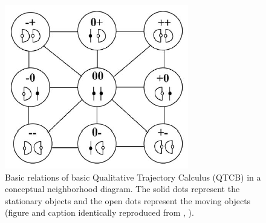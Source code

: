 		\begin{figure}[h]
			\centering
			\includegraphics[scale=1]{images/qtcb}
			\caption{Basic relations of basic Qualitative Trajectory Calculus (QTCB) in a conceptual neighborhood diagram. The solid dots represent the stationary objects and the open dots represent the moving objects (figure and caption identically reproduced from \cite{chen2015survey}, \cite{van2004representing}).}
			\label{fig:qtcb}
		\end{figure}		
		
		\newpage
		
